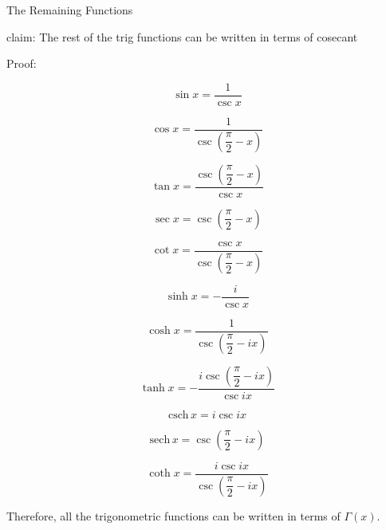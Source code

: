 \documentclass[12pt]{article}
\begin{document}
\begin{section}{The Remaining Functions}
	
	\noindent claim: The rest of the trig functions can be written in terms of cosecant

	\noindent Proof:

	\begin{equation}\sin x=\dfrac1{\csc x}\end{equation}

	\begin{equation}\cos x=\dfrac1{\csc\left(\dfrac\pi2-x\right)}\end{equation}

	\begin{equation}\tan x=\dfrac{\csc\left(\dfrac\pi2-x\right)}{\csc x}\end{equation}

	
	\begin{equation}\sec x=\csc\left(\dfrac\pi2-x\right)\end{equation}

	\begin{equation}\cot x=\dfrac{\csc x}{\csc\left(\dfrac\pi2-x\right)}\end{equation}


	\begin{equation}\sinh x=-\dfrac i{\csc x}\end{equation}

	\begin{equation}\cosh x=\dfrac1{\csc\left(\dfrac\pi2-ix\right)}\end{equation}

	\begin{equation}\tanh x=-\dfrac{i\csc\left(\dfrac\pi2-ix\right)}{\csc ix}\end{equation}

	\begin{equation}\text{csch}\,x=i\csc ix\end{equation}

	\begin{equation}\text{sech}\,x=\csc\left(\dfrac\pi2-ix\right)\end{equation}

	\begin{equation}\coth x=\dfrac{i\csc ix}{\csc\left(\dfrac\pi2-ix\right)}\end{equation}

	Therefore, all the trigonometric functions can be written in terms of $\Gamma(x)$.

	\noindent\blacksquare
\end{section}
\end{document}
